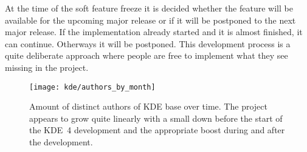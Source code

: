 At the time of the soft feature freeze it is decided whether the feature will
be available for the upcoming major release or if it will be postponed to the
next major release. If the implementation already started and it is almost
finished, it can continue. Otherways it will be postponed. This development
process is a quite deliberate approach where people are free to implement what
they see missing in the project.

\begin{figure}[htbp]
  \centering
  \texttt{[image: kde/authors\_by\_month]}
  \caption{Amount of distinct authors of KDE base over time. The project
  appears to grow quite linearly with a small down before the start of the
  KDE~4 development and the appropriate boost during and after the development.}
\end{figure}


